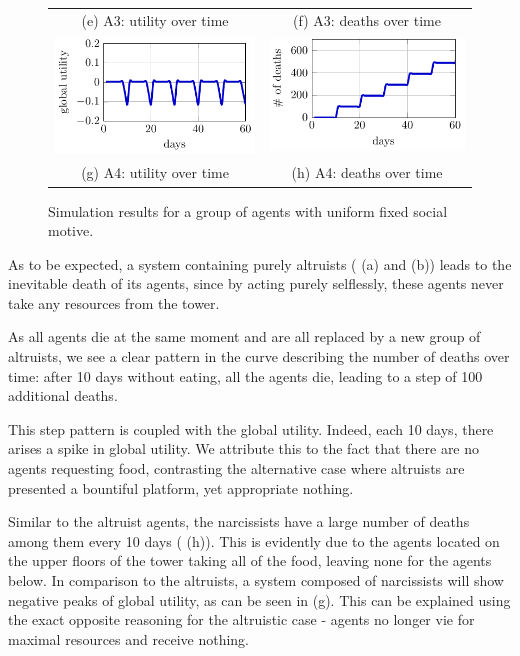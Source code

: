 \begin{figure}[htb]
\begin{tabular}{cc}
    (e) A3: utility over time & (f) A3: deaths over time
    \\[8pt]
     \includegraphics[width=0.3\linewidth]{008_team_6_agent_design/A/SOMAS_A4_utility.pdf} &   \includegraphics[width=0.3\linewidth]{008_team_6_agent_design/A/SOMAS_A4_deaths.pdf} \\[0pt]
    (g) A4: utility over time & (h) A4: deaths over time
    \end{tabular}
    \caption{Simulation results for a group of agents with uniform fixed social motive.}
    \label{fig:res_A}%
\end{figure}



As to be expected, a system containing purely altruists ( (a) and (b)) leads to the inevitable death of its agents, since by acting purely selflessly, these agents never take any resources from the tower.

As all agents die at the same moment and are all replaced by a new group of altruists, we see a clear pattern in the curve describing the number of deaths over time: after 10 days without eating, all the agents die, leading to a step of 100 additional deaths. 

This step pattern is coupled with the global utility. Indeed, each 10 days, there arises a spike in global utility. We attribute this to the fact that there are no agents requesting food, contrasting the alternative case where altruists are presented a bountiful platform, yet appropriate nothing. 

Similar to the altruist agents, the narcissists have a large number of deaths among them every 10 days ( (h)). This is evidently due to the agents located on the upper floors of the tower taking all of the food, leaving none for the agents below. In comparison to the altruists, a system composed of narcissists will show negative peaks of global utility, as can be seen in  (g). This can be explained using the exact opposite reasoning for the altruistic case - agents no longer vie for maximal resources and receive nothing.

